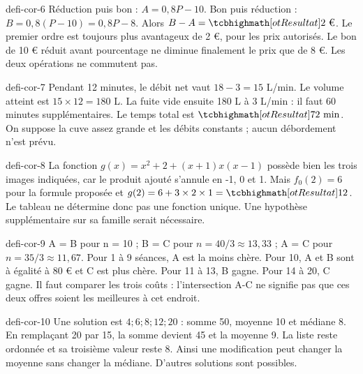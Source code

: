 \begin{blocEdition}{defi-cor-6}
Réduction puis bon : $A=0{,}8P-10$. Bon puis réduction : $B=0{,}8(P-10)=0{,}8P-8$. Alors $B-A=\res{2\text{ €}}$. Le premier ordre est toujours plus avantageux de 2 €, pour les prix autorisés. Le bon de 10 € réduit avant pourcentage ne diminue finalement le prix que de 8 €. Les deux opérations ne commutent pas.
\end{blocEdition}
\begin{blocEdition}{defi-cor-7}
Pendant 12 minutes, le débit net vaut $18-3=15$ L/min. Le volume atteint est $15\times12=180$ L. La fuite vide ensuite 180 L à 3 L/min : il faut 60 minutes supplémentaires. Le temps total est $\res{72\text{ min}}$. On suppose la cuve assez grande et les débits constants ; aucun débordement n’est prévu.
\end{blocEdition}
\begin{blocEdition}{defi-cor-8}
La fonction $g(x)=x^2+2+(x+1)x(x-1)$ possède bien les trois images indiquées, car le produit ajouté s’annule en -1, 0 et 1. Mais $f_0(2)=6$ pour la formule proposée et $g(2)=6+3\times2\times1=\res{12}$. Le tableau ne détermine donc pas une fonction unique. Une hypothèse supplémentaire sur sa famille serait nécessaire.
\end{blocEdition}
\begin{blocEdition}{defi-cor-9}
A = B pour n = 10 ; B = C pour $n=40/3\approx13{,}33$ ; A = C pour $n=35/3\approx11{,}67$. Pour 1 à 9 séances, A est la moins chère. Pour 10, A et B sont à égalité à 80 € et C est plus chère. Pour 11 à 13, B gagne. Pour 14 à 20, C gagne. Il faut comparer les trois coûts : l’intersection A-C ne signifie pas que ces deux offres soient les meilleures à cet endroit.
\end{blocEdition}
\begin{blocEdition}{defi-cor-10}
Une solution est $4;6;8;12;20$ : somme 50, moyenne 10 et médiane 8. En remplaçant 20 par 15, la somme devient 45 et la moyenne 9. La liste reste ordonnée et sa troisième valeur reste 8. Ainsi une modification peut changer la moyenne sans changer la médiane. D’autres solutions sont possibles.
\end{blocEdition}
